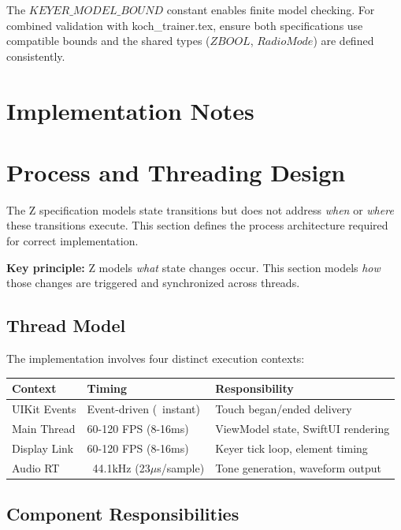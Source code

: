 \documentclass[a4paper,10pt,fleqn]{article}
\begin{document}
The $KEYER\_MODEL\_BOUND$ constant enables finite model checking. For combined
validation with koch\_trainer.tex, ensure both specifications use compatible
bounds and the shared types ($ZBOOL$, $RadioMode$) are defined consistently.

\section{Implementation Notes}
\section{Process and Threading Design}
\label{sec:threading}

The Z specification models state transitions but does not address \emph{when}
or \emph{where} these transitions execute. This section defines the process
architecture required for correct implementation.

\textbf{Key principle:} Z models \emph{what} state changes occur. This section
models \emph{how} those changes are triggered and synchronized across threads.

\subsection{Thread Model}

The implementation involves four distinct execution contexts:

\begin{center}
\begin{tabular}{llp{6cm}}
\hline
Context & Timing & Responsibility \\
\hline
UIKit Events & Event-driven (~instant) & Touch began/ended delivery \\
Main Thread & 60-120 FPS (8-16ms) & ViewModel state, SwiftUI rendering \\
Display Link & 60-120 FPS (8-16ms) & Keyer tick loop, element timing \\
Audio RT & ~44.1kHz (23$\mu$s/sample) & Tone generation, waveform output \\
\hline
\end{tabular}
\end{center}

\subsection{Component Responsibilities}
\end{document}
